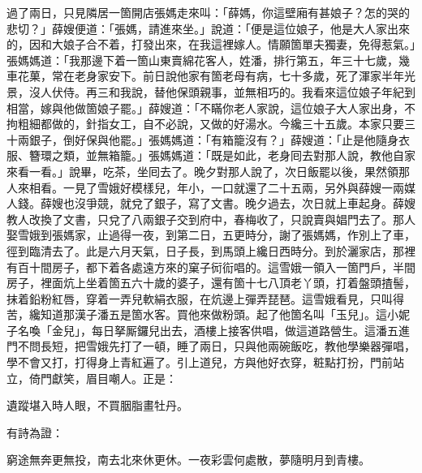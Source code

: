 過了兩日，只見隣居一箇開店張媽走來叫：「薛媽，你這壁廂有甚娘子？怎的哭的悲切？」薛嫂便道：「張媽，請進來坐。」說道：「便是這位娘子，他是大人家出來的，因和大娘子合不着，打發出來，在我這裡嫁人。情願箇單夫獨妻，免得惹氣。」張媽媽道：「我那邊下着一箇山東賣綿花客人，姓潘，排行第五，年三十七歲，幾車花菓，常在老身家安下。前日說他家有箇老母有病，七十多歲，死了渾家半年光景，沒人伏侍。再三和我說，替他保頭親事，並無相巧的。我看來這位娘子年紀到相當，嫁與他做箇娘子罷。」薛嫂道：「不瞞你老人家說，這位娘子大人家出身，不拘粗細都做的，針指女工，自不必說，又做的好湯水。今纔三十五歲。本家只要三十兩銀子，倒好保與他罷。」張媽媽道：「有箱籠沒有？」薛嫂道：「止是他隨身衣服、簪環之類，並無箱籠。」張媽媽道：「既是如此，老身囘去對那人說，教他自家來看一看。」說畢，吃茶，坐囘去了。晚夕對那人說了，次日飯罷以後，果然領那人來相看。一見了雪娥好模樣兒，年小，一口就還了二十五兩，另外與薛嫂一兩媒人錢。薛嫂也沒爭競，就兌了銀子，寫了文書。晚夕過去，次日就上車起身。薛嫂教人改換了文書，只兌了八兩銀子交到府中，春梅收了，只說賣與娼門去了。{}那人娶雪娥到張媽家，止過得一夜，到第二日，五更時分，謝了張媽媽，作別上了車，徑到臨清去了。此是六月天氣，日子長，到馬頭上纔日西時分。到於灑家店，那裡有百十間房子，都下着各處遠方來的窠子衏䘕唱的。這雪娥一領入一箇門戶，半間房子，裡面炕上坐着箇五六十歲的婆子，還有箇十七八頂老丫頭，打着盤頭揸髻，抹着鉛粉紅唇，穿着一弄兒軟絹衣服，在炕邊上彈弄琵琶。這雪娥看見，只叫得苦，纔知道那漢子潘五是箇水客。買他來做粉頭。起了他箇名叫「玉兒」。這小妮子名喚「金兒」，每日拏厮鑼兒出去，酒樓上接客供唱，做這道路營生。這潘五進門不問長短，把雪娥先打了一頓，睡了兩日，只與他兩碗飯吃，{}教他學樂器彈唱，學不會又打，打得身上青紅遍了。引上道兒，方與他好衣穿，粧點打扮，門前站立，倚門獻笑，眉目嘲人。正是：

遺蹤堪入時人眼，不買胭脂畫牡丹。

有詩為證：

窮途無奔更無投，南去北來休更休。一夜彩雲何處散，夢隨明月到青樓。

